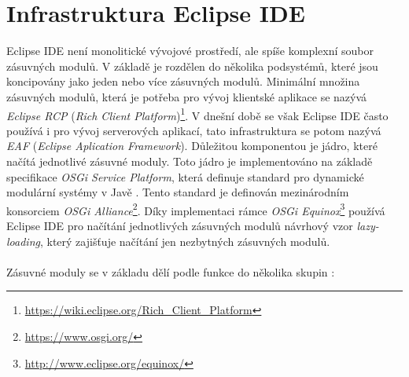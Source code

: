   \section{Infrastruktura Eclipse IDE}%
  Eclipse IDE není monolitické vývojové prostředí, ale spíše komplexní soubor zásuvných modulů. V základě je rozdělen do několika podsystémů, které jsou koncipovány jako jeden nebo více zásuvných modulů. Minimální množina zásuvných modulů, která je potřeba pro vývoj klientské aplikace se nazývá \emph{Eclipse RCP} (\emph{Rich Client Platform})\footnote{\url{https://wiki.eclipse.org/Rich_Client_Platform}}. V dnešní době se však Eclipse IDE často používá i pro vývoj serverových aplikací, tato infrastruktura se potom nazývá \emph{EAF} (\emph{Eclipse Aplication Framework}). Důležitou komponentou je jádro, které načítá jednotlivé zásuvné moduly. Toto jádro je implementováno na základě specifikace \emph{OSGi Service Platform}, která definuje standard pro dynamické modulární systémy v Javě \cite{Plugins}. Tento standard je definován mezinárodním konsorciem \emph{OSGi Alliance}\footnote{\url{https://www.osgi.org/}}. Díky implementaci rámce \emph{OSGi Equinox}\footnote{\url{http://www.eclipse.org/equinox/}} používá Eclipse IDE pro načítání jednotlivých zásuvných modulů návrhový vzor \emph{lazy-loading}, který zajišťuje načítání jen nezbytných zásuvných modulů.
  \\
  \\
  \noindent
  Zásuvné moduly se v základu dělí podle funkce do několika skupin \cite{Plugins}:

